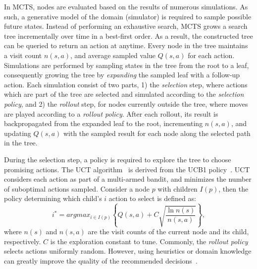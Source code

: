 \documentclass[conference]{IEEEtran}
\begin{document}
In MCTS, nodes are evaluated based on the results of numerous simulations. As such, a generative model of the domain (\ie simulator) is required to sample possible future states. Instead of performing an exhaustive search, MCTS grows a search tree incrementally over time in a best-first order. As a result, the constructed tree can be queried to return an action at anytime. Every node in the tree maintains a visit count $n(s,a)$, and average sampled value $Q(s,a)$ for each action. Simulations are performed by sampling states in the tree from the root to a leaf, consequently growing the tree by \emph{expanding} the sampled leaf with a follow-up action. Each simulation consist of two parts, 1) the \emph{selection} step, where actions which are part of the tree are selected and simulated according to the {\it selection policy}, and 2) the \emph{rollout} step, for nodes currently outside the tree, where moves are played according to a \emph{rollout policy}. After each rollout, its result is backpropagated from the expanded leaf to the root, incrementing $n(s,a)$, and updating $Q(s,a)$ with the sampled result for each node along the selected path in the tree.

During the selection step, a policy is required to explore the tree to choose promising actions. The UCT algorithm~\cite{kocsis2006bandit} is derived from the UCB1 policy~\cite{auer2002using}. UCT considers each action as part of a multi-armed bandit, and minimizes the number of suboptimal actions sampled. Consider a node $p$ with children $I(p)$, then the policy determining which child's $i$ action to select is defined as:
\begin{equation}
\label{eq:uct}
i^* = argmax_{i \in I(p)}\left\{ Q(s,a) + C \sqrt{ \frac{\ln{n(s)}}{n(s, a)}}\right\},
\end{equation}
where $n(s)$ and $n(s, a)$ are the visit counts of the current node and its child, respectively. $C$ is the exploration constant to tune. Commonly, the \emph{rollout policy} selects actions uniformly random. However, using heuristics or domain knowledge can greatly improve the quality of the recommended decisions~\cite{browne2012survey}.
\end{document}
